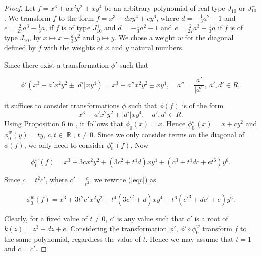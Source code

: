 \documentclass[noend]{amsproc}
\theoremstyle{definition}
\DeclareMathOperator{\R}{\mathbb{R}}
\begin{document}
\begin{proof}
Let $f=x^3+ax^2y^2\pm xy^4$ be an arbitrary polynomial of real type $J_{10}^+$ or $J_{10}^-$.  We transform $f$ to the form $f=x^3+dxy^4+ey^6$, where $d=-\frac{1}{3}a^2+1$ and $e=\frac{2}{27}a^3-\frac{1}{3}a$, if $f$ is of type $J_{10}^+$ and $d=-\frac{1}{3}a^2-1$ and $e=\frac{2}{27}a^3+\frac{1}{3}a$ if $f$ is of type $J_{10}^-$, by $x\mapsto x-\frac{a}{3}y^2$ and $y\mapsto y$. We chose a weight $w$ for the diagonal defined by $f$ with the weights of $x$ and $y$ natural numbers. 

Since  there exist a transformation $\phi'$ such that

\begin{equation}\label{phi'}
\phi'(x^3+a'x^2y^2\pm |d'|xy^4)=x^3+a''x^2y^2\pm xy^4,\quad a''=\frac{a'}{|d'|},\  a',d'\in R,
\end{equation}

it suffices to consider transformations $\phi$ such that $\phi(f)$ is of the form 
\begin{equation}\label{form}
x^3+a'x^2y^2\pm |d'|xy^4,\quad a',d'\in R.
\end{equation}
Using Proposition 6 in \cite{MS2013}, it follows that $\phi_0(x)=x$. Hence $\phi_0^w(x)=x+cy^2$ and $\phi_0^w(y)=ty$, $c,t\in\R$, $t\neq 0$. Since we only consider terms on the diagonal of $\phi(f)$, we only need to consider $\phi_0^w(f)$. Now

\begin{equation}\label{eqc}
\phi_0^w(f)=x^3+3cx^2y^2+(3c^2+t^4d)xy^4+(c^3+t^4dc+et^6)y^6.
\end{equation}

Since $c=t^2c'$, where $c'=\frac{c}{t^2}$, we rewrite (\ref{eqc}) as

\begin{equation}\label{eqc'}
\phi_0^w(f)=x^3+3t^2c'x^2y^2+t^4(3c'^2+d)xy^4+t^6(c'^3+dc'+e)y^6.
\end{equation}

Clearly, for a fixed value of $t\neq 0$, $c'$ is any value such that $c'$ is a root of $k(z)=z^3+dz+e$. Considering the transformation $\phi'$, $\phi'\circ\phi_0^w$ transform $f$ to the same polynomial, regardless the value of $t$. Hence we may assume that $t=1$ and $c=c'$. 


\end{proof}
\end{document}
